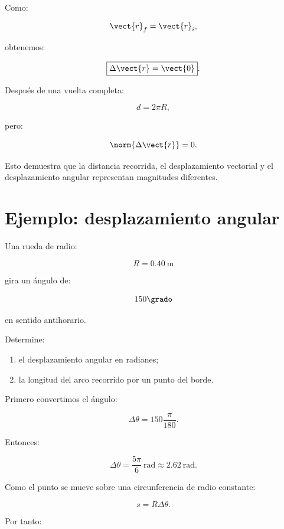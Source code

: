 Como:

\[
\vect{r}_f=\vect{r}_i,
\]

obtenemos:

\[
\boxed{\Delta\vect{r}=\vect{0}}.
\]

\begin{interpretacion}

Después de una vuelta completa:

\[
d=2\pi R,
\]

pero:

\[
\norm{\Delta\vect{r}}=0.
\]

Esto demuestra que la distancia recorrida, el desplazamiento vectorial y el
desplazamiento angular representan magnitudes diferentes.

\end{interpretacion}


\section{Ejemplo: desplazamiento angular}

\begin{ejemplo}

Una rueda de radio:

\[
R=\SI{0.40}{\meter}
\]

gira un ángulo de:

\[
150\grado
\]

en sentido antihorario.

Determine:

\begin{enumerate}[label=\alph*)]
    \item el desplazamiento angular en radianes;
    \item la longitud del arco recorrido por un punto del borde.
\end{enumerate}

\end{ejemplo}

Primero convertimos el ángulo:

\[
\Delta\theta
=
150\frac{\pi}{180}.
\]

Entonces:

\[
\boxed{
\Delta\theta
=
\frac{5\pi}{6}\ \si{\radian}
\approx
\SI{2.62}{\radian}
}.
\]

Como el punto se mueve sobre una circunferencia de radio constante:

\[
s=R\Delta\theta.
\]

Por tanto:

